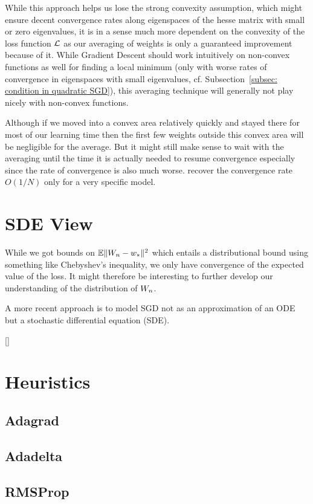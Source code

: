 While this approach helps us lose the strong convexity assumption, which might
ensure decent convergence rates along eigenspaces of the hesse matrix with
small or zero eigenvalues, it is in a sense much more dependent on the convexity
of the loss function \(\mathcal{L}\) as our averaging of weights is only a
guaranteed improvement because of it. While Gradient Descent should work
intuitively on non-convex functions as well for finding a local minimum (only with
worse rates of convergence in eigenspaces with small eigenvalues, cf.
Subsection~\ref{subsec: condition in quadratic SGD}), this averaging technique
will generally not play nicely with non-convex functions.

Although if we moved into a convex area relatively quickly and stayed there for
most of our learning time then the first few weights outside this convex
area will be negligible for the average.
But it might still make sense to wait with the averaging until the time it is
actually needed to resume convergence especially since the rate of convergence
is also much worse. \textcite{bachNonstronglyconvexSmoothStochastic2013}
recover the convergence rate \(O(1/N)\) only for a very specific model.

\section{SDE View}

While we got bounds on \(\mathbb{E}\|W_n - w_*\|^2\) which entails a
distributional bound using something like Chebyshev's inequality, we only
have convergence of the expected value of the loss. It might therefore be
interesting to further develop our understanding of the distribution of \(W_n\).

A more recent approach is to model SGD not as an approximation of an ODE but a
stochastic differential equation (SDE).


[\textcite{simsekliTailIndexAnalysisStochastic2019}]


\section{Heuristics}

\subsection{Adagrad}

\subsection{Adadelta}

\subsection{RMSProp}


\endinput
